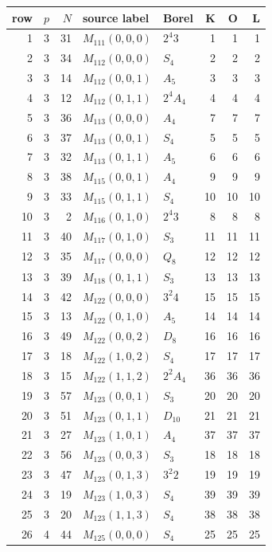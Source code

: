 \documentclass[11pt,a4paper]{article}
\begin{document}
\begin{longtable}{rrr|l|l|rrr}\toprule
row&$p$&$N$&source label&Borel&K&O&L\\\midrule\endhead
1 & 3 & 31 & $M_{111}(0,0,0)$ & $2^4 3$ & 1 & 1 & 1\\
2 & 3 & 34 & $M_{112}(0,0,0)$ & $S_4$ & 2 & 2 & 2\\
3 & 3 & 14 & $M_{112}(0,0,1)$ & $A_5$ & 3 & 3 & 3\\
4 & 3 & 12 & $M_{112}(0,1,1)$ & $2^4 A_4$ & 4 & 4 & 4\\
5 & 3 & 36 & $M_{113}(0,0,0)$ & $A_4$ & 7 & 7 & 7\\
6 & 3 & 37 & $M_{113}(0,0,1)$ & $S_4$ & 5 & 5 & 5\\
7 & 3 & 32 & $M_{113}(0,1,1)$ & $A_5$ & 6 & 6 & 6\\
8 & 3 & 38 & $M_{115}(0,0,1)$ & $A_4$ & 9 & 9 & 9\\
9 & 3 & 33 & $M_{115}(0,1,1)$ & $S_4$ & 10 & 10 & 10\\
10 & 3 & 2 & $M_{116}(0,1,0)$ & $2^4 3$ & 8 & 8 & 8\\
11 & 3 & 40 & $M_{117}(0,1,0)$ & $S_3$ & 11 & 11 & 11\\
12 & 3 & 35 & $M_{117}(0,0,0)$ & $Q_8$ & 12 & 12 & 12\\
13 & 3 & 39 & $M_{118}(0,1,1)$ & $S_3$ & 13 & 13 & 13\\
14 & 3 & 42 & $M_{122}(0,0,0)$ & $3^2 4$ & 15 & 15 & 15\\
15 & 3 & 13 & $M_{122}(0,1,0)$ & $A_5$ & 14 & 14 & 14\\
16 & 3 & 49 & $M_{122}(0,0,2)$ & $D_8$ & 16 & 16 & 16\\
17 & 3 & 18 & $M_{122}(1,0,2)$ & $S_4$ & 17 & 17 & 17\\
18 & 3 & 15 & $M_{122}(1,1,2)$ & $2^2 A_4$ & 36 & 36 & 36\\
19 & 3 & 57 & $M_{123}(0,0,1)$ & $S_3$ & 20 & 20 & 20\\
20 & 3 & 51 & $M_{123}(0,1,1)$ & $D_{10}$ & 21 & 21 & 21\\
21 & 3 & 27 & $M_{123}(1,0,1)$ & $A_4$ & 37 & 37 & 37\\
22 & 3 & 56 & $M_{123}(0,0,3)$ & $S_3$ & 18 & 18 & 18\\
23 & 3 & 47 & $M_{123}(0,1,3)$ & $3^2 2$ & 19 & 19 & 19\\
24 & 3 & 19 & $M_{123}(1,0,3)$ & $S_4$ & 39 & 39 & 39\\
25 & 3 & 20 & $M_{123}(1,1,3)$ & $S_4$ & 38 & 38 & 38\\
26 & 4 & 44 & $M_{125}(0,0,0)$ & $S_4$ & 25 & 25 & 25\\

\end{longtable}
\end{document}
